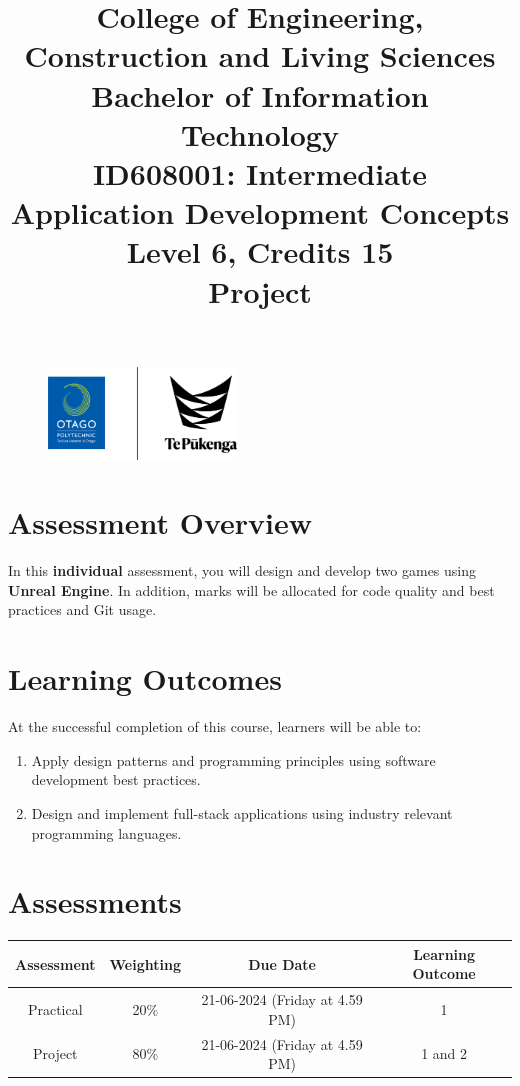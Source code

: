 \documentclass{article}
\author{}
\begin{document}
\begin{figure}
	\centering
	\includegraphics[width=50mm]{../../resources/img/logo.png}
\end{figure}

\title{College of Engineering, Construction and Living Sciences\\Bachelor of Information Technology\\ID608001: Intermediate Application Development Concepts\\Level 6, Credits 15\\\textbf{Project}}
\date{}
\maketitle

\section*{Assessment Overview}
In this \textbf{individual} assessment, you will design and develop two games using \textbf{Unreal Engine}. In addition, marks will be allocated for code quality and best practices and Git usage.

\section*{Learning Outcomes}
At the successful completion of this course, learners will be able to:
\begin{enumerate}
	\item Apply design patterns and programming principles using software development best practices.
	\item Design and implement full-stack applications using industry relevant programming languages.
\end{enumerate}

\section*{Assessments}
\renewcommand{\arraystretch}{1.5}
\begin{tabular}{|c|c|c|c|}
	\hline
	\textbf{Assessment}                                 & \textbf{Weighting} & \textbf{Due Date}            & \textbf{Learning Outcome} \\ \hline
	\small Practical & \small 20\%        & \small 21-06-2024 (Friday at 4.59 PM)   & \small 1                   \\ \hline
	\small Project                 & \small 80\%        & \small 21-06-2024 (Friday at 4.59 PM) \small  & \small 1 and 2                   \\ \hline
\end{tabular}
\end{document}
